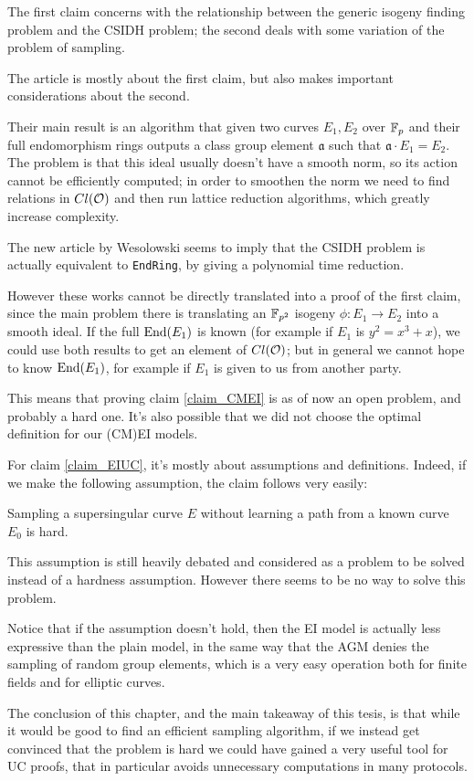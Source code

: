 The first claim concerns with the relationship between the generic isogeny finding problem and the CSIDH problem; the second deals with some variation of the problem of sampling.

The article \cite{CSIDH_EndRing} is mostly about the first claim, but also makes important considerations about the second.

Their main result is an algorithm that given two curves $E_1,E_2$ over $\mathbb{F}_p$ and their full endomorphism rings outputs a class group element $\mathfrak{a}$ such that $\mathfrak{a}\cdot E_1=E_2$. The problem is that this ideal usually doesn't have a smooth norm, so its action cannot be efficiently computed; in order to smoothen the norm we need to find relations in $Cl(\mathcal{O})$ and then run lattice reduction algorithms, which greatly increase complexity.

The new article by Wesolowski \cite{Weso_CSIDH} seems to imply that the CSIDH problem is actually equivalent to \texttt{EndRing}, by giving a polynomial time reduction.

However these works cannot be directly translated into a proof of the first claim, since the main problem there is translating an $\mathbb{F}_{p^2}$ isogeny $\phi: E_1\to E_2$ into a smooth ideal. If the full $\operatorname{End}(E_1)$ is known (for example if $E_1$ is $y^2=x^3+x$), we could use both results to get an element of $Cl(\mathcal{O})$; but in general we cannot hope to know $\operatorname{End}(E_1)$, for example if $E_1$ is given to us from another party.

This means that proving claim \ref{claim_CMEI} is as of now an open problem, and probably a hard one. It's also possible that we did not choose the optimal definition for our (CM)EI models.

For claim \ref{claim_EIUC}, it's mostly about assumptions and definitions. Indeed, if we make the following assumption, the claim follows very easily:
\begin{assumption}
    Sampling a supersingular curve $E$ without learning a path from a known curve $E_0$ is hard.
\end{assumption}
This assumption is still heavily debated and considered as a problem to be solved instead of a hardness assumption. However there seems to be no way to solve this problem.

Notice that if the assumption doesn't hold, then the EI model is actually less expressive than the plain model, in the same way that the AGM denies the sampling of random group elements, which is a very easy operation both for finite fields and for elliptic curves.

The conclusion of this chapter, and the main takeaway of this tesis, is that while it would be good to find an efficient sampling algorithm, if we instead get convinced that the problem is hard we could have gained a very useful tool for UC proofs, that in particular avoids unnecessary computations in many protocols.



